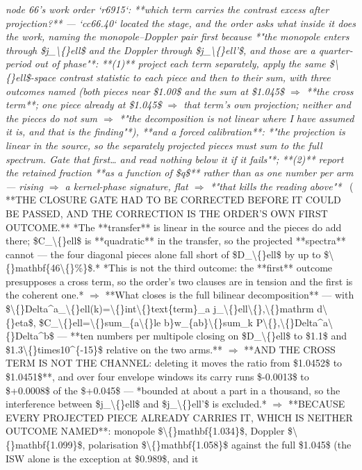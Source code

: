 \begin{description}
\textit{node 66's work order `r6915`: **which term carries the contrast excess after projection?** --- `cc66.40` located the stage, and the order asks what inside it does the work, naming the monopole--Doppler pair first because *"the monopole enters through \$j\_\textbackslash\{\}ell\$ and the Doppler through \$j\_\textbackslash\{\}ell'\$, and those are a quarter-period out of phase"*: **(1)** project each term separately, apply the same \$\textbackslash\{\}ell\$-space contrast statistic to each piece and then to their sum, with three outcomes named (both pieces near \$1.00\$ and the sum at \$1.045\$ \ensuremath{\Rightarrow} **the cross term**; one piece already at \$1.045\$ \ensuremath{\Rightarrow} that term's own projection; neither and the pieces do not sum \ensuremath{\Rightarrow} *"the decomposition is not linear where I have assumed it is, and that is the finding"*), **and a forced calibration**: *"the projection is linear in the source, so the separately projected pieces must sum to the full spectrum. Gate that first\ldots{} and read nothing below it if it fails"*; **(2)** report the retained fraction **as a function of \$q\$** rather than as one number per arm --- rising \ensuremath{\Rightarrow} a kernel-phase signature, flat \ensuremath{\Rightarrow} *"that kills the reading above"*} \ ( **THE CLOSURE GATE HAD TO BE CORRECTED BEFORE IT COULD BE PASSED, AND THE CORRECTION IS THE ORDER'S OWN FIRST OUTCOME.** *The **transfer** is linear in the source and the pieces do add there; \$C\_\textbackslash\{\}ell\$ is **quadratic** in the transfer, so the projected **spectra** cannot --- the four diagonal pieces alone fall short of \$D\_\textbackslash\{\}ell\$ by up to \$\textbackslash\{\}mathbf\{46\textbackslash\{\}\%\}\$.*  *This is not the third outcome: the **first** outcome presupposes a cross term, so the order's two clauses are in tension and the first is the coherent one.* \ensuremath{\Rightarrow} **What closes is the full bilinear decomposition** --- with \$\textbackslash\{\}Delta\textasciicircum{}a\_\textbackslash\{\}ell(k)=\textbackslash\{\}int\textbackslash\{\}text\{term\}\_a j\_\textbackslash\{\}ell\textbackslash\{\},\textbackslash\{\}mathrm d\textbackslash\{\}eta\$, \$C\_\textbackslash\{\}ell=\textbackslash\{\}sum\_\{a\textbackslash\{\}le b\}w\_\{ab\}\textbackslash\{\}sum\_k P\textbackslash\{\},\textbackslash\{\}Delta\textasciicircum{}a\textbackslash\{\}Delta\textasciicircum{}b\$ --- **ten numbers per multipole closing on \$D\_\textbackslash\{\}ell\$ to \$1.1\$ and \$1.3\textbackslash\{\}times10\textasciicircum{}\{-15\}\$ relative on the two arms.** \ensuremath{\Rightarrow}  **AND THE CROSS TERM IS NOT THE CHANNEL: deleting it moves the ratio from \$1.0452\$ to \$1.0451\$**, and over four envelope windows its carry runs \$-0.0013\$ to \$+0.0008\$ of the \$+0.045\$ --- *bounded at about a part in a thousand, so the interference between \$j\_\textbackslash\{\}ell\$ and \$j\_\textbackslash\{\}ell'\$ is excluded.* \ensuremath{\Rightarrow}  **BECAUSE EVERY PROJECTED PIECE ALREADY CARRIES IT, WHICH IS NEITHER OUTCOME NAMED**: monopole \$\textbackslash\{\}mathbf\{1.034\}\$, Doppler \$\textbackslash\{\}mathbf\{1.099\}\$, polarisation \$\textbackslash\{\}mathbf\{1.058\}\$ against the full \$1.045\$ (the ISW alone is the exception at \$0.989\$, and it 
\end{description}
